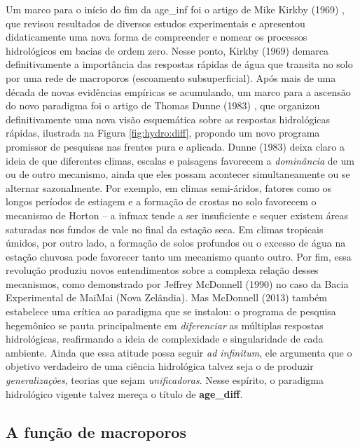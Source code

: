 \documentclass[./main.tex]{subfiles}
\begin{document}
\par Um marco para o início do fim da \gls{age_inf} foi o artigo de Mike Kirkby (1969) \cite{Kirkby1969}, que revisou resultados de diversos estudos experimentais e apresentou didaticamente uma nova forma de compreender e nomear os processos hidrológicos em bacias de ordem zero. Nesse ponto, Kirkby (1969) demarca definitivamente a importância das respostas rápidas de água que transita no solo por uma rede de macroporos (escoamento subsuperficial). Após mais de uma década de novas evidências empíricas se acumulando, um marco para a ascensão do novo \gls{paradigma} foi o artigo de Thomas Dunne (1983) \cite{Dunne1983}, que organizou definitivamente uma nova visão esquemática sobre as respostas hidrológicas rápidas, ilustrada na Figura \ref{fig:hydro:diff}, propondo um novo programa promissor de pesquisas nas frentes pura e aplicada. Dunne (1983) deixa claro a ideia de que diferentes climas, escalas e paisagens favorecem a \textit{dominância} de um ou de outro mecanismo, ainda que eles possam acontecer simultaneamente ou se alternar sazonalmente. Por exemplo, em climas semi-áridos, fatores como os longos períodos de estiagem e a formação de crostas no solo favorecem o mecanismo de Horton -- a \gls{infmax} tende a ser insuficiente e sequer existem áreas saturadas nos fundos de vale no final da estação seca. Em climas tropicais úmidos, por outro lado, a formação de solos profundos ou o excesso de água na estação chuvosa pode favorecer tanto um mecanismo quanto outro. Por fim, essa revolução produziu novos entendimentos sobre a complexa relação desses mecanismos, como demonstrado por Jeffrey McDonnell (1990) \cite{mcdonnell1990} no caso da Bacia Experimental de MaiMai (Nova Zelândia). Mas McDonnell (2013) \cite{Mcdonnell2013} também estabelece uma crítica ao \gls{paradigma} que se instalou: o programa de pesquisa hegemônico se pauta principalmente em \textit{diferenciar} as múltiplas respostas hidrológicas, reafirmando a ideia de complexidade e singularidade de cada ambiente. Ainda que essa atitude possa seguir \textit{ad infinitum}, ele argumenta que o objetivo verdadeiro de uma ciência hidrológica talvez seja o de produzir \textit{generalizações}, teorias que sejam \textit{unificadoras}. Nesse espírito, o \gls{paradigma} hidrológico vigente talvez mereça o título de \textbf{\gls{age_diff}}.

\subsection{A função de macroporos}
\end{document}
